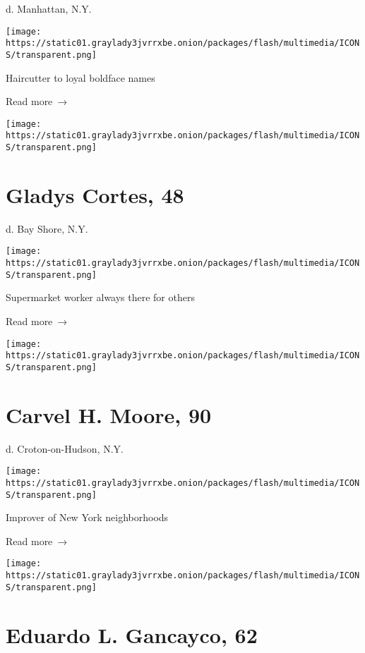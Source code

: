 d. Manhattan, N.Y.

\texttt{[image: https://static01.graylady3jvrrxbe.onion/packages/flash/multimedia/ICONS/transparent.png]}

Haircutter to loyal boldface names

 Read more~→

\href{https://www.nytimes3xbfgragh.onion/2020/05/29/nyregion/gladys-cortes-dead-coronavirus.html}{}

\texttt{[image: https://static01.graylady3jvrrxbe.onion/packages/flash/multimedia/ICONS/transparent.png]}

\hypertarget{gladys-cortes-48}{%
\section{Gladys Cortes, 48}\label{gladys-cortes-48}}

d. Bay Shore, N.Y.

\texttt{[image: https://static01.graylady3jvrrxbe.onion/packages/flash/multimedia/ICONS/transparent.png]}

Supermarket worker always there for others

 Read more~→

\href{https://www.nytimes3xbfgragh.onion/2020/05/28/obituaries/carvel-moore-dead-coronavirus.html}{}

\texttt{[image: https://static01.graylady3jvrrxbe.onion/packages/flash/multimedia/ICONS/transparent.png]}

\hypertarget{carvel-h-moore-90}{%
\section{Carvel H. Moore, 90}\label{carvel-h-moore-90}}

d. Croton-on-Hudson, N.Y.

\texttt{[image: https://static01.graylady3jvrrxbe.onion/packages/flash/multimedia/ICONS/transparent.png]}

Improver of New York neighborhoods

 Read more~→

\href{https://www.nytimes3xbfgragh.onion/2020/05/28/nyregion/eduardo-l-gancayco-dead-coronavirus.html}{}

\texttt{[image: https://static01.graylady3jvrrxbe.onion/packages/flash/multimedia/ICONS/transparent.png]}

\hypertarget{eduardo-l-gancayco-62}{%
\section{Eduardo L. Gancayco, 62}\label{eduardo-l-gancayco-62}}

